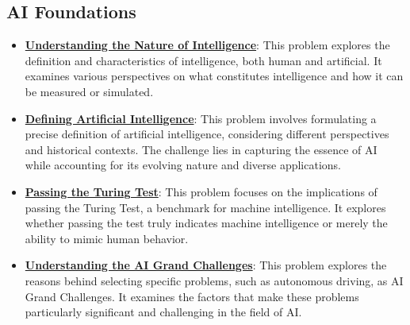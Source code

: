 \documentclass{article}%
\begin{document}
\subsection{AI Foundations}%
\label{subsec:AIFoundations}%
\begin{itemize}[leftmargin=*]%
\item \href{\url{https://purdue.brightspace.com/d2l/common/assets/pdfjs-d2l-dist/1.0.14-legacy/web/viewer.html?file=\%252Fcontent\%252Fenforced\%252F1095467-wl.202510.CS.24300.001\%252F02L2-Intro.pdf\%253Fou\%253D1095467\&lang=en-us\&container=d2l-fileviewer-rendered-pdf\&fullscreen=d2l-fileviewer-rendered-pdf-dialog\&height=667}#page=5}{\textbf{Understanding the Nature of Intelligence}}: This problem explores the definition and characteristics of intelligence, both human and artificial. It examines various perspectives on what constitutes intelligence and how it can be measured or simulated.%
\item \href{\url{https://purdue.brightspace.com/d2l/common/assets/pdfjs-d2l-dist/1.0.14-legacy/web/viewer.html?file=\%252Fcontent\%252Fenforced\%252F1095467-wl.202510.CS.24300.001\%252F02L2-Intro.pdf\%253Fou\%253D1095467\&lang=en-us\&container=d2l-fileviewer-rendered-pdf\&fullscreen=d2l-fileviewer-rendered-pdf-dialog\&height=667}#page=5}{\textbf{Defining Artificial Intelligence}}: This problem involves formulating a precise definition of artificial intelligence, considering different perspectives and historical contexts. The challenge lies in capturing the essence of AI while accounting for its evolving nature and diverse applications.%
\item \href{\url{https://purdue.brightspace.com/d2l/common/assets/pdfjs-d2l-dist/1.0.14-legacy/web/viewer.html?file=\%252Fcontent\%252Fenforced\%252F1095467-wl.202510.CS.24300.001\%252F02L2-Intro.pdf\%253Fou\%253D1095467\&lang=en-us\&container=d2l-fileviewer-rendered-pdf\&fullscreen=d2l-fileviewer-rendered-pdf-dialog\&height=667}#page=6}{\textbf{Passing the Turing Test}}: This problem focuses on the implications of passing the Turing Test, a benchmark for machine intelligence. It explores whether passing the test truly indicates machine intelligence or merely the ability to mimic human behavior.%
\item \href{\url{https://purdue.brightspace.com/d2l/common/assets/pdfjs-d2l-dist/1.0.14-legacy/web/viewer.html?file=\%252Fcontent\%252Fenforced\%252F1095467-wl.202510.CS.24300.001\%252F02L2-Intro.pdf\%253Fou\%253D1095467\&lang=en-us\&container=d2l-fileviewer-rendered-pdf\&fullscreen=d2l-fileviewer-rendered-pdf-dialog\&height=667}#page=43}{\textbf{Understanding the AI Grand Challenges}}: This problem explores the reasons behind selecting specific problems, such as autonomous driving, as AI Grand Challenges. It examines the factors that make these problems particularly significant and challenging in the field of AI.%

\end{itemize}
\end{document}
